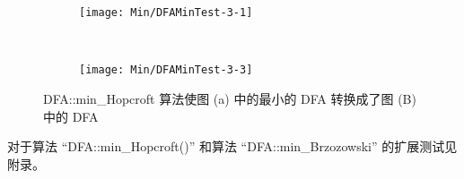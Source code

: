 \begin{figure}[!htbp]
    \centering
    \begin{subfigure}[b]{0.4\textwidth}
        \texttt{[image: Min/DFAMinTest-3-1]}
        \caption{}
        \label{fig:DFAMin-3-1-inside}
    \end{subfigure}
    ~
    \begin{subfigure}[b]{0.4\textwidth}
        \texttt{[image: Min/DFAMinTest-3-3]}
        \caption{}
        \label{fig:DFAMin-3-3-inside}
    \end{subfigure}
    \caption{DFA::min\_Hopcroft 算法使图 (a) 中的最小的 DFA 转换成了图 (B) 中的 DFA}
    \label{fig:DFAMinHoop-3}
  \end{figure}

对于算法 “DFA::min\_Hopcroft()” 和算法 “DFA::min\_Brzozowski” 的扩展测试见附录。